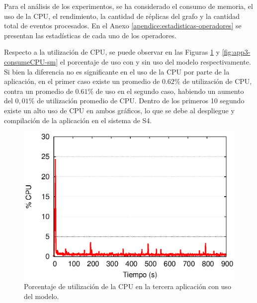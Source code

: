 Para el an\'alisis de los experimentos, se ha considerado el consumo de memoria, el uso de la CPU, \normalsize{el rendimiento, la cantidad de r\'eplicas del grafo} y la cantidad total de eventos procesados. En el Anexo \ref{apendice:estadisticas-operadores} \normalsize{se presentan las estad\'isticas de cada uno de los operadores.}


Respecto a la utilizaci\'on de CPU, se puede observar en las Figuras \ref{fig:app3-consumeCPU-cm} y \ref{fig:app3-consumeCPU-sm} el porcentaje de uso con y sin uso del modelo respectivamente. Si bien la diferencia no es significante en el uso de la CPU por parte de la aplicaci\'on, en el primer caso existe un promedio de $0.62\%$ de utilizaci\'on de CPU, contra un promedio de $0.61\%$ de uso en el segundo caso, habiendo un aumento del $0,01\%$ de utilizaci\'on promedio de CPU. Dentro de los primeros 10 segundo existe un alto uso de CPU en ambos gr\'aficos, lo que se debe al despliegue y compilaci\'on de la aplicaci\'on en el sistema de S4.

\begin{figure}[!ht]
\centering
    \includegraphics[scale=0.75]{images/exp/app3/cm/fisical/consumeCPU.eps}
    \caption{Porcentaje de utilizaci\'on de la CPU en la tercera aplicaci\'on con uso del modelo.}
    \label{fig:app3-consumeCPU-cm}
\end{figure}

